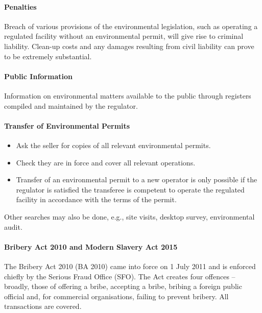 \documentclass[
]{article}
\providecommand{\tightlist}{%
  \setlength{\itemsep}{0pt}\setlength{\parskip}{0pt}}
\begin{document}
\hypertarget{penalties}{%
\paragraph{Penalties}\label{penalties}}

Breach of various provisions of the environmental legislation, such as
operating a regulated facility without an environmental permit, will
give rise to criminal liability. Clean-up costs and any damages
resulting from civil liability can prove to be extremely substantial.

\hypertarget{public-information}{%
\paragraph{Public Information}\label{public-information}}

Information on environmental matters available to the public through
registers compiled and maintained by the regulator.

\hypertarget{transfer-of-environmental-permits}{%
\paragraph{Transfer of Environmental
Permits}\label{transfer-of-environmental-permits}}

\begin{itemize}
\tightlist
\item
  Ask the seller for copies of all relevant environmental permits.
\item
  Check they are in force and cover all relevant operations.
\item
  Transfer of an environmental permit to a new operator is only possible
  if the regulator is satisfied the transferee is competent to operate
  the regulated facility in accordance with the terms of the permit.
\end{itemize}

Other searches may also be done, e.g., site visits, desktop survey,
environmental audit.

\hypertarget{bribery-act-2010-and-modern-slavery-act-2015}{%
\paragraph{Bribery Act 2010 and Modern Slavery Act
2015}\label{bribery-act-2010-and-modern-slavery-act-2015}}

The Bribery Act 2010 (BA 2010) came into force on 1 July 2011 and is
enforced chiefly by the Serious Fraud Office (SFO). The Act creates four
offences -- broadly, those of offering a bribe, accepting a bribe,
bribing a foreign public official and, for commercial organisations,
failing to prevent bribery. All transactions are covered.
\end{document}
